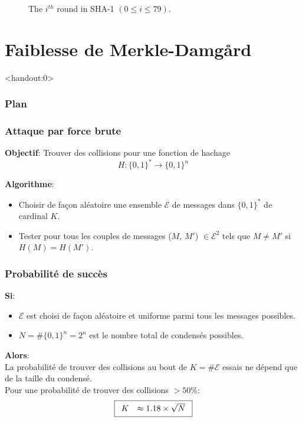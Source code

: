 \begin{frame}[fragile]
\begin{figure}[!ht]
\begin{tikzpicture}[scale=0.8]
        \end{tikzpicture}
        \caption{\label{fig:SHA-1}The $i^{th}$ round in SHA-1 $(0\le i \le 79)$.}
\end{figure}

\end{frame}
\section{Faiblesse de Merkle-Damg\r{a}rd}

\begin{frame}<handout:0>
  \frametitle{Plan}
  \tableofcontents[currentsection]
\end{frame}

\begin{frame}
  \frametitle{Attaque par force brute}
  \vfill
\textbf{Objectif}: Trouver des collisions pour une fonction de hachage $$H: \{0,1\}^* \rightarrow \{0,1\}^n$$

\textbf{Algorithme}:
\begin{itemize}
        \item Choisir de façon aléatoire une ensemble $\mathcal{E}$ de messages dans $\{0,1\}^*$ de cardinal $K$.
        \item Tester pour tous les couples de messages ($M$, $M'$) $\in \mathcal{E}^2$ tels que $M \neq M'$ si $H(M)=H(M')$.
\end{itemize}
  \vfill
\end{frame}

\begin{frame}
  \frametitle{Probabilité de succès}
  \vfill
  \textbf{Si}:
  \begin{itemize}
        \item $\mathcal{E}$ est choisi de façon aléatoire et uniforme parmi tous les messages possibles.
        \item $N = \# \{0,1\}^n = 2^n $ est le nombre total de condensés possibles.
  \end{itemize}
  \vspace{1cm}
  \textbf{Alors}:\\ 
  La probabilité de trouver des collisions au bout de $K=\# \mathcal{E}$ essais ne dépend que de la taille du condensé.\\
  \vspace{0.5cm} 
Pour une probabilité de trouver des collisions \textbf{$>50\%$}:
\begin{equation}
   \fbox{$
   \begin{array}{rcl}
      K & \approx 1.18 \times \sqrt{N}\\
   \end{array}
   $}
   \end{equation}
  \vfill
\end{frame}

